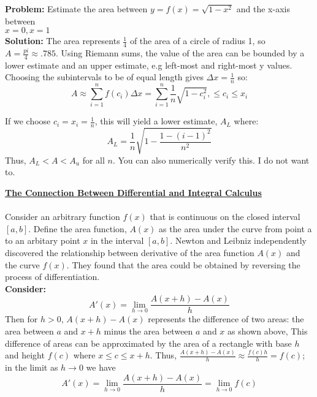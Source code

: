 \documentclass[11pt]{article}
\theoremstyle{plain}
\theoremstyle{remark}
\theoremstyle{plain}
\newcommand{\bd}{\textbf}
\begin{document}
\begin{tcolorbox}[colback=magenta!5!white,colframe = magenta!75!black,title=Example]
    \bd{Problem:} Estimate the area between $y=f(x) = \sqrt{1-x^2}$ and the x-axis between \\$x=0, x=1$ \\

    \bd{Solution:} The area represents $\frac{1}{4}$ of the area of a circle of radius 1, so $A = \frac{pi}{4} \approx .785$. Using Riemann 
    sums, the value of the area can be bounded by a lower estimate and an upper estimate, e.g left-most and right-most y values. Choosing the subintervals to be of equal length gives $\Delta x = \frac{1}{n}$ so:
    \[A \approx \sum_{i=1}^{n}f(c_i)\Delta x = \sum_{i=1}^{n}\frac{1}{n}\sqrt{1 - c_i^2}, \leq c_i \leq x_i\]

    If we choose $c_i = x_i = \frac{1}{n}$, this will yield a lower estimate, $A_L$ where: \[A_L = \frac{1}{n}\sqrt{1-\frac{1-(i-1)^2}{n^2}}\]
    Thus, $A_L < A < A_u$ for all $n$. You can also numerically verify this. I do not want to.
\end{tcolorbox}   

\bd{\underline{The Connection Between Differential and Integral Calculus}} \\\\
Consider an arbitrary function $f(x)$ that is continuous on the closed interval $[a,b]$. Define the area function, $A(x)$ as the area under the curve from 
point a to an arbitary point $x$ in the interval $[a,b]$. Newton and Leibniz independently discovered the relationship between derivative of the area function $A(x)$
and the curve $f(x)$. They found that the area could be obtained by reversing the process of differentiation. \\

\bd{Consider:} \[A'(x) = \lim_{h\to 0}\frac{A(x+h)-A(x)}{h}\] Then for $h>0$, $A(x+h)-A(x)$ represents the difference of two areas: the area between $a$ and $x+h$
minus the area between $a$ and $x$ as shown above, This difference of areas can be approximated by the area of a rectangle with base $h$ and height $f(c)$ where $x \leq c \leq x+h$. Thus, $\frac{A(x+h)-A(x)}{h}\approx \frac{f(c)h}{h} = f(c)$; 
in the limit as $h\to 0$ we have \[A'(x) = \lim_{h\to 0} \frac{A(x+h)-A(x)}{h} = \lim_{h\to 0}f(c)\]
\end{document}
